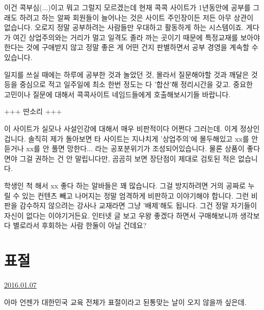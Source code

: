 이건 콕부심(...)이고 뭐고 그럴지 모르겠는데
현재 콕콕 사이트가 1년동안에 공부를 그래도 하려고 하는 알짜 회원들이 늘어나는 것은
사이트 주인장이든 저든 아무 상관이 없습니다. 오로지 정말 공부하려는 사람들만 우대하고 활동하게 하는 시스템이죠.
게다가 여긴 상업주의와는 거리가 멀고 일격도 졸라 까는 곳이기 때문에 특정교재를 보아야한다는 것에 구애받지 않고
정말 좋은 게 어떤 건지 판별하면서 공부 경영을 계속할 수 있습니다.
\vspace{5mm}

일지를 쓰실 때에는 하루에 공부한 것과 놀았던 것, 몰라서 질문해야할 것과 깨달은 것등을 중심으로 적고
일주일에 최소 한번 정도는 다 '합산'해 정리시간을 갖고.
중요한 고민이나 질문에 대해서 콕콕사이트 네임드들에게 호출해보시기들 바랍니다.
\vspace{5mm}

+++ 딴소리 +++
\vspace{5mm}

이 사이트가 실모나 사설인강에 대해서 매우 비판적이다 어쩐다 그러는데.
이게 정상인 겁니다. 솔직히 제가 돌아보면 타 사이트는 지나치게 '상업주의'에 몰두해있고
xx를 안 듣거나 xx를 안 풀면 망한다... 라는 공포분위기가 조성되어있습니다.
물론 상품이 좋다면야 그걸 권하는 건 안 말립니다만, 곰곰히 보면 장단점이 제대로 검토된 적은 없습니다.
\vspace{5mm}

학생인 척 해서 xx 좋다 하는 알바들은 꽤 많습니다.
그걸 방지하려면 거의 공짜로 누릴 수 있는 컨텐츠 빼고 나머지는 정말 엄격하게 비판하고 이야기해야 합니다.
그런 비판을 감수하지 않으려는 강사나 교재라면 그냥 '배제'해도 됩니다. 그건 정말 자기들이 자신이 없다는 이야기거든요.
인터넷 글 보고 우왕 좋겠다 하면서 구매해보니까 생각보다 별로라서 후회하는 사람 한둘이 아닐 건데요?
\vspace{5mm}








\section{표절}
\href{https://www.kockoc.com/Apoc/578553}{2016.01.07}

\vspace{5mm}

아마 언젠가 대한민국 교육 전체가 표절이라고 된통맞는 날이 오지 않을까 싶은데.
\vspace{5mm}

